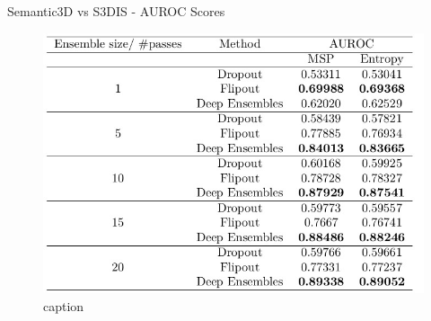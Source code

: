 \documentclass[aspectratio=169]{beamer}
\begin{document}
\begin{frame}{Semantic3D vs S3DIS - AUROC Scores}
    \begin{figure}
        \centering
        \includegraphics[scale=.35]{images/ood1/AUROC_OOD1_Scores.jpg}
        \caption{caption}
        \label{fig:ood1_AUROC}
    \end{figure}
\end{frame}
\end{document}
